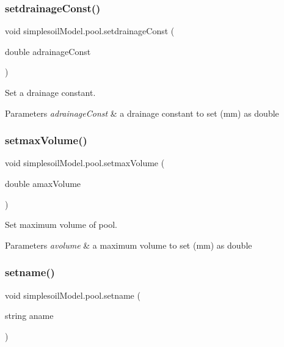 \subsubsection{\texorpdfstring{setdrainageConst()}{setdrainageConst()}}
{\footnotesize\ttfamily void simplesoil\+Model.\+pool.\+setdrainage\+Const (\begin{DoxyParamCaption}\item[{double}]{adrainage\+Const }\end{DoxyParamCaption})\hspace{0.3cm}{\ttfamily [inline]}}



Set a drainage constant. 


\begin{DoxyParams}{Parameters}
{\em adrainage\+Const} & a drainage constant to set (mm) as double \\
\hline
\end{DoxyParams}
\mbox{\label{classsimplesoil_model_1_1pool_a4afb35706d081f816ac7e0ee97a56018}} 
\subsubsection{\texorpdfstring{setmaxVolume()}{setmaxVolume()}}
{\footnotesize\ttfamily void simplesoil\+Model.\+pool.\+setmax\+Volume (\begin{DoxyParamCaption}\item[{double}]{amax\+Volume }\end{DoxyParamCaption})\hspace{0.3cm}{\ttfamily [inline]}}



Set maximum volume of pool. 


\begin{DoxyParams}{Parameters}
{\em avolume} & a maximum volume to set (mm) as double \\
\hline
\end{DoxyParams}
\mbox{\label{classsimplesoil_model_1_1pool_a52016de02c5aa32f2fb6927252619494}} 
\subsubsection{\texorpdfstring{setname()}{setname()}}
{\footnotesize\ttfamily void simplesoil\+Model.\+pool.\+setname (\begin{DoxyParamCaption}\item[{string}]{aname }\end{DoxyParamCaption})\hspace{0.3cm}{\ttfamily [inline]}}



